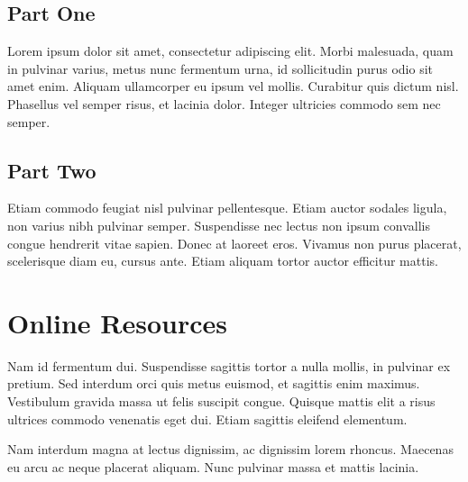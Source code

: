\subsection{Part One}

Lorem ipsum dolor sit amet, consectetur adipiscing elit. Morbi
malesuada, quam in pulvinar varius, metus nunc fermentum urna, id
sollicitudin purus odio sit amet enim. Aliquam ullamcorper eu ipsum
vel mollis. Curabitur quis dictum nisl. Phasellus vel semper risus, et
lacinia dolor. Integer ultricies commodo sem nec semper.

\subsection{Part Two}

Etiam commodo feugiat nisl pulvinar pellentesque. Etiam auctor sodales
ligula, non varius nibh pulvinar semper. Suspendisse nec lectus non
ipsum convallis congue hendrerit vitae sapien. Donec at laoreet
eros. Vivamus non purus placerat, scelerisque diam eu, cursus
ante. Etiam aliquam tortor auctor efficitur mattis.

\section{Online Resources}

Nam id fermentum dui. Suspendisse sagittis tortor a nulla mollis, in
pulvinar ex pretium. Sed interdum orci quis metus euismod, et sagittis
enim maximus. Vestibulum gravida massa ut felis suscipit
congue. Quisque mattis elit a risus ultrices commodo venenatis eget
dui. Etiam sagittis eleifend elementum.

Nam interdum magna at lectus dignissim, ac dignissim lorem
rhoncus. Maecenas eu arcu ac neque placerat aliquam. Nunc pulvinar
massa et mattis lacinia.


\endinput
